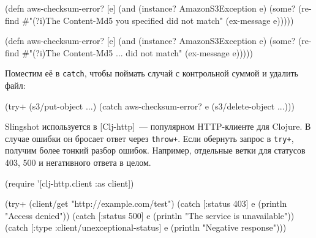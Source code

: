 \ifnarrow

\begin{english}
  \begin{clojure}
(defn aws-checksum-error? [e]
  (and
    (instance? AmazonS3Exception e)
    (some?
      (re-find
        #"(?i)The Content-Md5
            you specified did not match"
        (ex-message e)))))
  \end{clojure}
\end{english}

\else

\begin{english}
  \begin{clojure}
(defn aws-checksum-error? [e]
  (and (instance? AmazonS3Exception e)
       (some?
        (re-find
         #"(?i)The Content-Md5 ... did not match"
         (ex-message e)))))
  \end{clojure}
\end{english}

\fi

\noindent
Поместим её в \verb|catch|, чтобы поймать случай с контрольной суммой и удалить
файл:

\begin{english}
  \begin{clojure}
(try+
  (s3/put-object ...)
  (catch aws-checksum-error? e
    (s3/delete-object ...)))
  \end{clojure}
\end{english}

Slingshot используется в [Clj-http]~---
популярном HTTP-кли\-ен\-те для Clojure. В случае ошибки он бросает ответ через
\verb|throw+|. Если обернуть запрос в \verb|try+|, получим более тонкий
разбор ошибок. Например, отдельные ветки для статусов 403, 500 и негативного
ответа в целом.

\pagebreakafive

\ifnarrow

\begin{english}
  \begin{clojure}
(require '[clj-http.client :as client])

(try+
 (client/get "http://example.com/test")
 (catch [:status 403] e
  (println "Access denied"))
 (catch [:status 500] e
  (println "The service is unavailable"))
 (catch
  [:type :client/unexceptional-status] e
  (println "Negative response")))
  \end{clojure}
\end{english}

